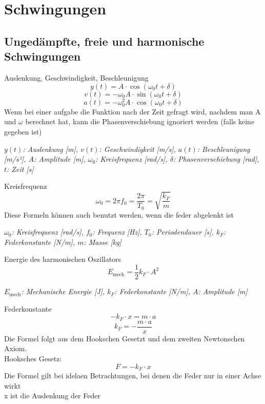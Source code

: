 \documentclass[a4paper,10pt]{article}
\newenvironment{displayformula}
{
	\begin{framed}
		\color{formulaColor}
	}
	{\end{framed}}
\newcommand{\formulalegend}[1]{%
	\par\vspace{0.5ex}%
	{{\color{legendColor}\RaggedRight\small\textit{#1}}}%
	\par\vspace{1.5ex}%
}
\begin{document}
\newpage

\section{Schwingungen}

\subsection{Ungedämpfte, freie und harmonische Schwingungen}

\begin{displayformula}
	Auslenkung, Geschwindigkeit, Beschleunigung
	\[
	y(t) = A \cdot \cos(\omega_0 t + \delta)
	\]
	\[
	v(t) = -\omega_0 A \cdot \sin(\omega_0 t + \delta)
	\]
	\[
	a(t) = -\omega_0^2 A \cdot \cos(\omega_0 t + \delta)
	\]
	Wenn bei einer aufgabe die Funktion nach der Zeit gefragt wird, nachdem man A und $\omega$ berechnet hat, kann die Phasenverschiebung ignoriert werden (falls keine gegeben ist)
\end{displayformula}
\formulalegend{
	\( y(t) \): Auslenkung [m], \( v(t) \): Geschwindigkeit [m/s], \( a(t) \): Beschleunigung [m/s²], \( A \): Amplitude [m], \( \omega_0 \): Kreisfrequenz [rad/s], \( \delta \): Phasenverschiebung [rad], \( t \): Zeit [s]
}

\begin{displayformula}
	Kreisfrequenz
	\[
	\omega_0 = 2\pi f_0 = \frac{2\pi}{T_0} = \sqrt{\frac{k_F}{m}}
	\]
	Diese Formeln können auch benutzt werden, wenn die feder abgelenkt ist
\end{displayformula}
\formulalegend{
	\( \omega_0 \): Kreisfrequenz [rad/s], \( f_0 \): Frequenz [Hz], \( T_0 \): Periodendauer [s], \( k_F \): Federkonstante [N/m], \( m \): Masse [kg]
}

\begin{displayformula}
	Energie des harmonischen Oszillators
	\[
	E_{\text{mech}} = \frac{1}{2} k_F \cdot A^2
	\]
\end{displayformula}
\formulalegend{
	\( E_{\text{mech}} \): Mechanische Energie [J], \( k_F \): Federkonstante [N/m], \( A \): Amplitude [m]
}

\begin{displayformula}
	Federkonstante
	\[
	-k_F \cdot x = m \cdot a
	\]
	\[
	k_F = - \frac{m \cdot a}{x}
	\]
	Die Formel folgt aus dem Hookschen Gesetzt und dem zweiten Newtonschen Axiom. \\ Hooksches Gesetz:
	\[
	F = -k_F \cdot x
	\]
	Die Formel gilt bei idelaen Betrachtungen, bei denen die Feder nur in einer Achse wirkt \\ x ist die Auslenkung der Feder
\end{displayformula}
\end{document}
